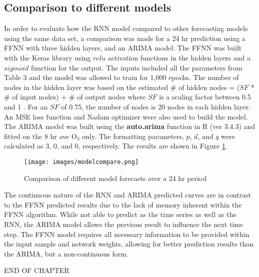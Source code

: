 \subsection{Comparison to different models}

In order to evaluate how the RNN model compared to other forecasting models using the same data set, a comparison was made for a 24 hr prediction using a FFNN with three hidden layers, and an ARIMA model. The FFNN was built with the Keras library using $relu$ activation functions in the hidden layers and a $sigmoid$ function for the output. The inputs included all the parameters from Table 3 and the model was allowed to train for 1,000 epochs. The number of nodes in the hidden layer was based on the estimated \# of hidden nodes = ($SF$ * \# of input nodes) + \# of output nodes where $SF$ is a scaling factor between 0.5 and 1 \citep{Papaleonidas2013}. For an $SF$ of 0.75, the number of nodes is 20 nodes in each hidden layer. An MSE loss function and Nadam optimizer were also used to build the model. The ARIMA model was built using the \textbf{auto.arima} function in R (ver 3.4.3) \citep{Hyndman2013} and fitted on the 8 hr ave O$_{3}$ only. The formatting parameters, $p$, $d$, and $q$ were calculated as 3, 0, and 0, respectively. The results are shown in Figure \ref{fig:diffmodels}.

%
\begin{figure}[H]
\centering
\texttt{[image: images/modelcompare.png]}
\caption{Comparison of different model forecasts over a 24 hr period}
\label{fig:diffmodels}
\end{figure}
%

The continuous nature of the RNN and ARIMA predicted curves are in contrast to the FFNN predicted results due to the lack of memory inherent within the FFNN algorithm. While not able to predict as the time series as well as the RNN, the ARIMA model allows the previous result to influence the next time step. The FFNN model requires all necessary information to be provided within the input sample and network weights, allowing for better prediction results than the ARIMA, but a non-continuous form. 

\bigskip
\begin{center}
END OF CHAPTER
\end{center}
